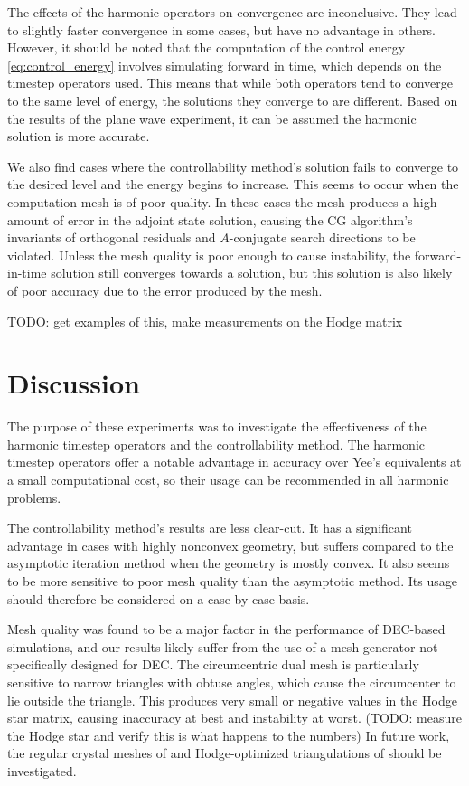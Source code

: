 \documentclass[utf8,english]{gradu3}
\begin{document}
The effects of the harmonic operators on convergence are inconclusive.
They lead to slightly faster convergence in some cases,
but have no advantage in others.
However, it should be noted that the computation
of the control energy \eqref{eq:control_energy}
involves simulating forward in time, which depends on the timestep operators used.
This means that while both operators tend to converge to the same level of energy,
the solutions they converge to are different.
Based on the results of the plane wave experiment,
it can be assumed the harmonic solution is more accurate.

We also find cases where the controllability method's solution
fails to converge to the desired level and the energy begins to increase.
This seems to occur when the computation mesh is of poor quality.
In these cases the mesh produces a high amount of error in the adjoint state solution,
causing the CG algorithm's invariants of orthogonal residuals
and $A$-conjugate search directions to be violated.
Unless the mesh quality is poor enough to cause instability,
the forward-in-time solution still converges
towards a solution, but this solution is also likely of poor accuracy
due to the error produced by the mesh.

TODO: get examples of this, make measurements on the Hodge matrix


\section{Discussion}

The purpose of these experiments was to investigate
the effectiveness of the harmonic time\-step operators
and the controllability method.
The harmonic timestep operators offer a notable advantage in accuracy
over Yee's equivalents at a small computational cost,
so their usage can be recommended in all harmonic problems.

The controllability method's results are less clear-cut.
It has a significant advantage in cases with highly nonconvex geometry,
but suffers compared to the asymptotic iteration method
when the geometry is mostly convex.
It also seems to be more sensitive to poor mesh quality
than the asymptotic method.
Its usage should therefore be considered on a case by case basis.

Mesh quality was found to be a major factor in the performance of DEC-based simulations,
and our results likely suffer from the use of a mesh generator
not specifically designed for DEC.
The circumcentric dual mesh is particularly sensitive to narrow triangles
with obtuse angles, which cause the circumcenter to lie outside the triangle.
This produces very small or negative values
in the Hodge star matrix, causing inaccuracy at best and instability at worst.
(TODO: measure the Hodge star and verify this is what happens to the numbers)
In future work, the regular crystal meshes of \textcite{rabina_numerical_2014}
and Hodge-optimized triangulations of \textcite{mullen_hot_2011} should be investigated.
\end{document}
